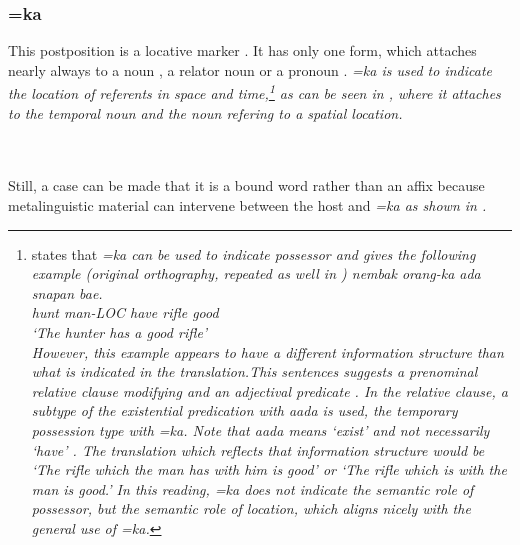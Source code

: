 \subsubsection{=ka}\label{sec:morph:=ka}
This postposition is a locative marker
\citep{SmithEtAl2004,
Ansaldo2008genesis,%
Ansaldo2009}.
It has only one form, which attaches nearly always to a noun , a relator noun  or a pronoun . 
\em =ka \em  is used to indicate the location of referents in space and time,\footnote{\citet[23]{Ansaldo2005ms}
 states that \em =ka \em can be used to indicate possessor and gives the following example (original orthography, repeated as well in \citet[30]{Ansaldo2008genesis})
 \gll nembak orang-ka ada snapan bae. \\
 hunt man-\textsc{LOC} have rifle good\\
 `The hunter has a good rifle'\\
 However, this example appears to have a different information structure than what is indicated in the translation.This sentences suggests a prenominal relative clause modifying  and an adjectival predicate . In the relative clause, a subtype of the existential predication with \em aada \em  {} is used, the temporary possession type with \em =ka\em. Note that \em aada \em means `exist' and not necessarily `have' . The translation which reflects that information structure would be `The rifle which the man has with him is good' or `The rifle which is with the man is good.' In this reading, \em =ka \em does not indicate the semantic role of possessor, but the semantic role of location, which aligns nicely with the general use of \em =ka\em.
}
as can be seen in , where it attaches to the temporal noun  and the noun  refering to a spatial location.


 \\ 
 \\
Still, a case can be made that it is a bound word rather than an affix because metalinguistic material can intervene between the host and \em =ka \em as shown in .

